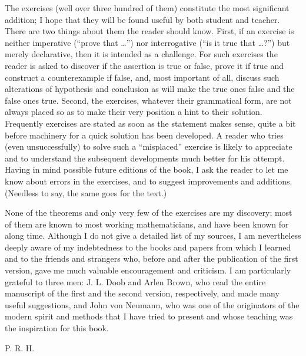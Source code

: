The exercises (well over three hundred of them) constitute the most significant
addition; I hope that they will be found useful by both student and teacher.
There are two things about them the reader should know. First, if an exercise is
neither imperative (``prove that \ldots'') nor interrogative (``is it true that
\ldots ?'') but merely declarative, then it is intended as a challenge. For such
exercises the reader is asked to discover if the assertion is true or false,
prove it if true and construct a counterexample if false, and, most important of
all, discuss such alterations of hypothesis and conclusion as will make the true
ones false and the false ones true. Second, the exercises, whatever their
grammatical form, are not always placed so as to make their very position a hint
to their solution. Frequently exercises are stated as soon as the statement
makes sense, quite a bit before machinery for a quick solution has been
developed. A reader who tries (even unsuccessfully) to solve such a
``misplaced'' exercise is likely to appreciate and to understand the subsequent
developments much better for his attempt. Having in mind possible future
editions of the book, I ask the reader to let me know about errors in the
exercises, and to suggest improvements and additions. (Needless to say, the same
goes for the text.)

None of the theorems and only very few of the exercises are my discovery; most
of them are known to most working mathematicians, and have been known for along
time. Although I do not give a detailed list of my sources, I am nevertheless
deeply aware of my indebtedness to the books and papers from which I learned and
to the friends and strangers who, before and after the publication of the first
version, gave me much valuable encouragement and criticism. I am particularly
grateful to three men: J. L. Doob and Arlen Brown, who read the entire
manuscript of the first and the second version, respectively, and made many
useful suggestions, and John von Neumann, who was one of the originators of the
modern spirit and methods that I have tried to present and whose teaching was
the inspiration for this book.

\begin{flushright}
    P. R. H.
\end{flushright}